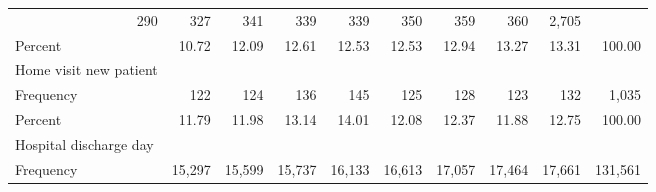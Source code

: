\documentclass{article}
\begin{document}
\begin{table}[!h]
\begin{tabular}{llllllllll}
  \multicolumn{1}{|r}{290} &
  \multicolumn{1}{r}{327} &
  \multicolumn{1}{r}{341} &
  \multicolumn{1}{r}{339} &
  \multicolumn{1}{r}{339} &
  \multicolumn{1}{r}{350} &
  \multicolumn{1}{r}{359} &
  \multicolumn{1}{r}{360} &
  \multicolumn{1}{r}{2,705} \\
\multicolumn{1}{l}{\hspace{2em}Percent} &
  \multicolumn{1}{|r}{10.72} &
  \multicolumn{1}{r}{12.09} &
  \multicolumn{1}{r}{12.61} &
  \multicolumn{1}{r}{12.53} &
  \multicolumn{1}{r}{12.53} &
  \multicolumn{1}{r}{12.94} &
  \multicolumn{1}{r}{13.27} &
  \multicolumn{1}{r}{13.31} &
  \multicolumn{1}{r}{100.00} \\
\multicolumn{1}{l}{\hspace{1em}Home visit new patient} &
  \multicolumn{1}{|r}{} &
  \multicolumn{1}{r}{} &
  \multicolumn{1}{r}{} &
  \multicolumn{1}{r}{} &
  \multicolumn{1}{r}{} &
  \multicolumn{1}{r}{} &
  \multicolumn{1}{r}{} &
  \multicolumn{1}{r}{} &
  \multicolumn{1}{r}{} \\
\multicolumn{1}{l}{\hspace{2em}Frequency} &
  \multicolumn{1}{|r}{122} &
  \multicolumn{1}{r}{124} &
  \multicolumn{1}{r}{136} &
  \multicolumn{1}{r}{145} &
  \multicolumn{1}{r}{125} &
  \multicolumn{1}{r}{128} &
  \multicolumn{1}{r}{123} &
  \multicolumn{1}{r}{132} &
  \multicolumn{1}{r}{1,035} \\
\multicolumn{1}{l}{\hspace{2em}Percent} &
  \multicolumn{1}{|r}{11.79} &
  \multicolumn{1}{r}{11.98} &
  \multicolumn{1}{r}{13.14} &
  \multicolumn{1}{r}{14.01} &
  \multicolumn{1}{r}{12.08} &
  \multicolumn{1}{r}{12.37} &
  \multicolumn{1}{r}{11.88} &
  \multicolumn{1}{r}{12.75} &
  \multicolumn{1}{r}{100.00} \\
\multicolumn{1}{l}{\hspace{1em}Hospital discharge day} &
  \multicolumn{1}{|r}{} &
  \multicolumn{1}{r}{} &
  \multicolumn{1}{r}{} &
  \multicolumn{1}{r}{} &
  \multicolumn{1}{r}{} &
  \multicolumn{1}{r}{} &
  \multicolumn{1}{r}{} &
  \multicolumn{1}{r}{} &
  \multicolumn{1}{r}{} \\
\multicolumn{1}{l}{\hspace{2em}Frequency} &
  \multicolumn{1}{|r}{15,297} &
  \multicolumn{1}{r}{15,599} &
  \multicolumn{1}{r}{15,737} &
  \multicolumn{1}{r}{16,133} &
  \multicolumn{1}{r}{16,613} &
  \multicolumn{1}{r}{17,057} &
  \multicolumn{1}{r}{17,464} &
  \multicolumn{1}{r}{17,661} &
  \multicolumn{1}{r}{131,561} \\

\end{tabular}
\end{table}
\end{document}

